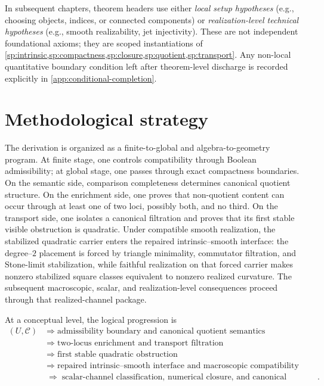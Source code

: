 \begin{remark}
In subsequent chapters, theorem headers use either
\emph{local setup hypotheses} (e.g., choosing objects, indices, or
connected components) or \emph{realization-level technical hypotheses}
(e.g., smooth realizability, jet injectivity). These are not independent
foundational axioms; they are scoped instantiations of
\cref{sp:intrinsic,sp:compactness,sp:closure,sp:quotient,sp:transport}.
Any non-local quantitative boundary condition left after theorem-level
discharge is recorded explicitly in \cref{app:conditional-completion}.
\end{remark}

\section{Methodological strategy}
The derivation is organized as a finite-to-global and algebra-to-geometry
program.
At finite stage, one controls compatibility through Boolean admissibility;
at global stage, one passes through exact compactness boundaries.
On the semantic side, comparison completeness determines canonical
quotient structure.
On the enrichment side, one proves that non-quotient content can occur
through at least one of two loci, possibly both, and no third.
On the transport side, one isolates a canonical filtration and proves
that its first stable visible obstruction is quadratic.
Under compatible smooth realization, the stabilized quadratic carrier
enters the repaired intrinsic--smooth interface: the degree--\(2\)
placement is forced by triangle minimality, commutator filtration, and
Stone-limit stabilization, while faithful realization on that forced
carrier makes nonzero stabilized square classes equivalent to nonzero
realized curvature.  The subsequent macroscopic, scalar, and
realization-level consequences proceed through that realized-channel
package.

At a conceptual level, the logical progression is
\[
		\begin{aligned}
			(U,\mathcal C)
			\;&\Longrightarrow\;\text{admissibility boundary and canonical quotient semantics}
			\\
			\;&\Longrightarrow\;\text{two-locus enrichment and transport filtration}
			\\
			\;&\Longrightarrow\;\text{first stable quadratic obstruction}
			\\
			\;&\Longrightarrow\;\text{repaired intrinsic--smooth interface and macroscopic compatibility laws}
			\\
			\;&\Longrightarrow\;\text{scalar-channel classification, numerical closure, and canonical realization}.
		\end{aligned}
	\]

